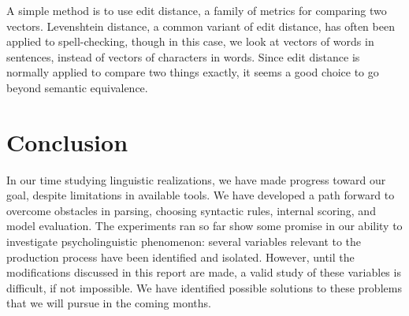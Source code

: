 \documentclass[11pt]{article}
\begin{document}
A simple method is to use edit distance, a family of metrics for comparing two vectors. Levenshtein distance, a common variant of edit distance, has often been applied to spell-checking, though in this case, we look at vectors of words in sentences, instead of vectors of characters in words. Since edit distance is normally applied to compare two things exactly, it seems a good choice to go beyond semantic equivalence.

\section{Conclusion}
In our time studying linguistic realizations, we have made progress toward our goal, despite limitations in available tools. We have developed a path forward to overcome obstacles in parsing, choosing syntactic rules, internal scoring, and model evaluation. The experiments ran so far show some promise in our ability to investigate psycholinguistic phenomenon: several variables relevant to the production process have been identified and isolated. However, until the modifications discussed in this report are made, a valid study of these variables is difficult, if not impossible. We have identified possible solutions to these problems that we will pursue in the coming months.  





\end{document}
